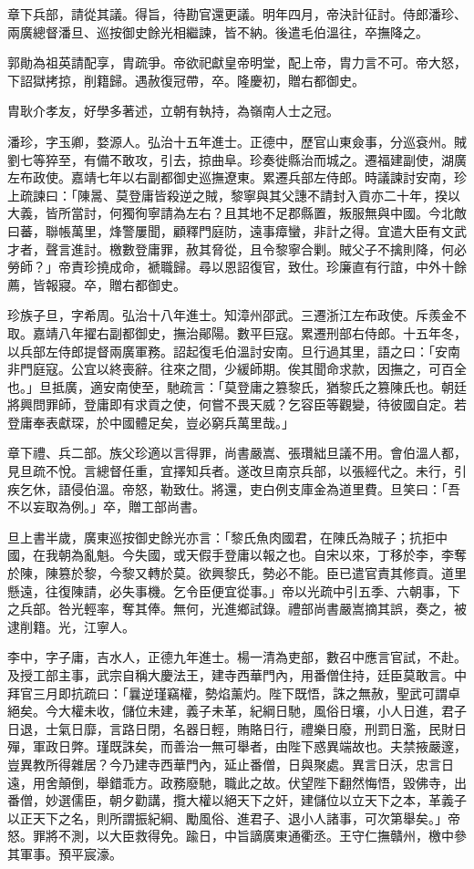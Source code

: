 \begin{pinyinscope}
章下兵部，請從其議。得旨，待勘官還更議。明年四月，帝決計征討。侍郎潘珍、兩廣總督潘旦、巡按御史餘光相繼諫，皆不納。後遣毛伯溫往，卒撫降之。

郭勛為祖英請配享，胄疏爭。帝欲祀獻皇帝明堂，配上帝，胄力言不可。帝大怒，下詔獄拷掠，削籍歸。遇赦復冠帶，卒。隆慶初，贈右都御史。

胄耿介孝友，好學多著述，立朝有執持，為嶺南人士之冠。

潘珍，字玉卿，婺源人。弘治十五年進士。正德中，歷官山東僉事，分巡袞州。賊劉七等猝至，有備不敢攻，引去，掠曲阜。珍奏徙縣治而城之。遷福建副使，湖廣左布政使。嘉靖七年以右副都御史巡撫遼東。累遷兵部左侍郎。時議諫討安南，珍上疏諫曰：「陳暠、莫登庸皆殺逆之賊，黎寧與其父譓不請封入貢亦二十年，揆以大義，皆所當討，何獨徇寧請為左右？且其地不足郡縣置，叛服無與中國。今北敵曰蕃，聯帳萬里，烽警屢聞，顧釋門庭防，遠事瘴蠻，非計之得。宜遣大臣有文武才者，聲言進討。檄數登庸罪，赦其脅從，且令黎寧合剿。賊父子不擒則降，何必勞師？」帝責珍撓成命，褫職歸。尋以恩詔復官，致仕。珍廉直有行誼，中外十餘薦，皆報寢。卒，贈右都御史。

珍族子旦，字希周。弘治十八年進士。知漳州邵武。三遷浙江左布政使。斥羨金不取。嘉靖八年擢右副都御史，撫治鄖陽。數平巨寇。累遷刑部右侍郎。十五年冬，以兵部左侍郎提督兩廣軍務。詔起復毛伯溫討安南。旦行過其里，語之曰：「安南非門庭寇。公宜以終喪辭。往來之間，少緩師期。俟其聞命求款，因撫之，可百全也。」旦抵廣，適安南使至，馳疏言：「莫登庸之篡黎氏，猶黎氏之篡陳氏也。朝廷將興問罪師，登庸即有求貢之使，何嘗不畏天威？乞容臣等觀變，待彼國自定。若登庸奉表獻琛，於中國體足矣，豈必窮兵萬里哉。」

章下禮、兵二部。族父珍適以言得罪，尚書嚴嵩、張瓚絀旦議不用。會伯溫人都，見旦疏不悅。言總督任重，宜擇知兵者。遂改旦南京兵部，以張經代之。未行，引疾乞休，語侵伯溫。帝怒，勒致仕。將還，吏白例支庫金為道里費。旦笑曰：「吾不以妄取為例。」卒，贈工部尚書。

旦上書半歲，廣東巡按御史餘光亦言：「黎氏魚肉國君，在陳氏為賊子；抗拒中國，在我朝為亂魁。今失國，或天假手登庸以報之也。自宋以來，丁移於李，李奪於陳，陳篡於黎，今黎又轉於莫。欲興黎氏，勢必不能。臣已遣官責其修貢。道里懸遠，往復陳請，必失事機。乞令臣便宜從事。」帝以光疏中引五季、六朝事，下之兵部。咎光輕率，奪其俸。無何，光進鄉試錄。禮部尚書嚴嵩摘其誤，奏之，被逮削籍。光，江寧人。

李中，字子庸，吉水人，正德九年進士。楊一清為吏部，數召中應言官試，不赴。及授工部主事，武宗自稱大慶法王，建寺西華門內，用番僧住持，廷臣莫敢言。中拜官三月即抗疏曰：「曩逆瑾竊權，勢焰薰灼。陛下既悟，誅之無赦，聖武可謂卓絕矣。今大權未收，儲位未建，義子未革，紀綱日馳，風俗日壤，小人日進，君子日退，士氣日靡，言路日閉，名器日輕，賄賂日行，禮樂日廢，刑罰日濫，民財日殫，軍政日弊。瑾既誅矣，而善治一無可舉者，由陛下惑異端故也。夫禁掖嚴邃，豈異教所得雜居？今乃建寺西華門內，延止番僧，日與聚處。異言日沃，忠言日遠，用舍顛倒，舉錯乖方。政務廢馳，職此之故。伏望陛下翻然悔悟，毀佛寺，出番僧，妙選儒臣，朝夕勸講，攬大權以絕天下之奸，建儲位以立天下之本，革義子以正天下之名，則所謂振紀綱、勵風俗、進君子、退小人諸事，可次第舉矣。」帝怒。罪將不測，以大臣救得免。踰日，中旨謫廣東通衢丞。王守仁撫贛州，檄中參其軍事。預平宸濠。


\end{pinyinscope}
